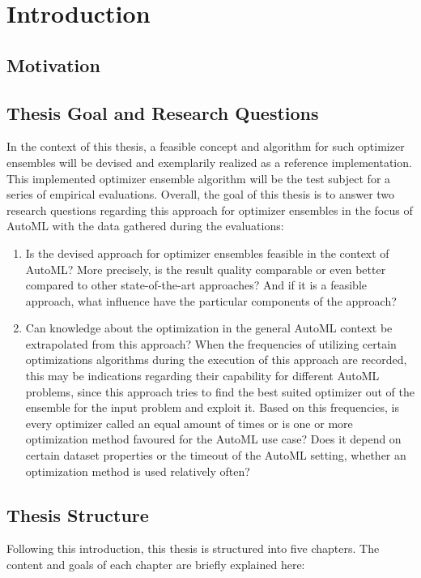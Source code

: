 %
\chapter{Introduction}
\label{sec:intro}

\section{Motivation}
\label{sec:intro:motivation}

\blindtext

\section{Thesis Goal and Research Questions}
\label{sec:intro:goal}
In the context of this thesis, a feasible concept and algorithm for such optimizer ensembles will be devised and exemplarily realized as a reference implementation.
This  implemented optimizer ensemble algorithm will be the test subject for a series of empirical evaluations.
Overall, the goal of this thesis is to answer two research questions regarding this approach for optimizer ensembles in the focus of AutoML with the data gathered during the evaluations:
\begin{enumerate}
    \item Is the devised approach for optimizer ensembles feasible in the context of AutoML?
    More precisely, is the result quality comparable or even better compared to other state-of-the-art approaches?
    And if it is a feasible approach, what influence have the particular components of the approach?
    \item Can knowledge about the optimization in the general AutoML context be extrapolated from this approach?
    When the frequencies of utilizing certain optimizations algorithms during the execution of this approach are recorded, this may be indications regarding their capability for different AutoML problems, since this approach tries to find the best suited optimizer out of the ensemble for the input problem and exploit it.
    Based on this frequencies, is every optimizer called an equal amount of times or is one or more optimization method favoured for the AutoML use case?
    Does it depend on certain dataset properties or the timeout of the AutoML setting, whether an optimization method is used relatively often?
\end{enumerate}

\section{Thesis Structure}
\label{sec:intro:structure}
Following this introduction, this thesis is structured into five chapters.
The content and goals of each chapter are briefly explained here:

